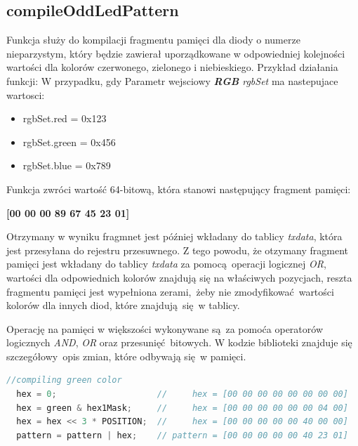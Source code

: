 \documentclass[eng,printmode]{mgr}
\begin{document}
\subsection{compileOddLedPattern} 

Funkcja służy do kompilacji fragmentu pamięci dla diody o numerze nieparzystym, który będzie zawierał uporządkowane w odpowiedniej kolejności wartości dla kolorów czerwonego, zielonego i niebieskiego.
Przykład działania funkcji:
W przypadku, gdy Parametr wejsciowy \emph{\textbf{RGB} rgbSet} ma nastepujace wartosci:

\begin{itemize}
  \item{rgbSet.red   = 0x123}
  \item{rgbSet.green = 0x456}
  \item{rgbSet.blue  = 0x789}
\end{itemize}
             
Funkcja zwróci wartość 64-bitową, która stanowi następujący fragment pamięci:

\vspace{0.3cm}
\hspace{0.3cm} \textbf{[00 00 00 89 67 45 23 01]}
\vspace{0.3cm}

Otrzymany w wyniku fragmnet jest później wkładany do tablicy \emph{txdata}, która jest przesyłana do rejestru przesuwnego. Z tego powodu, że otzymany fragment pamięci jest wkładany do tablicy \emph{txdata} za pomocą operacji logicznej \emph{OR}, wartości dla odpowiednich kolorów znajdują się na właściwych pozycjach, reszta fragmentu pamięci jest wypełniona zerami, żeby nie zmodyfikować wartości kolorów dla innych diod, które znajdują się w tablicy.

Operację na pamięci w większości wykonywane są za pomoća operatorów logicznych \emph{AND}, \emph{OR} oraz przesunięć bitowych. W kodzie biblioteki znajduje się szczegółowy opis zmian, które odbywają się w pamięci.

\vspace{0.3cm}
\begin{lstlisting}[language=c,frame=single,caption={Fragment kodu, w którym przedstawiony jest komentarz ilustrujący efekt wykonywania operacji na pamięci}]
  //compiling green color     
  hex = 0;                    //     hex = [00 00 00 00 00 00 00 00]
  hex = green & hex1Mask;     //     hex = [00 00 00 00 00 00 04 00]
  hex = hex << 3 * POSITION;  //     hex = [00 00 00 00 00 40 00 00]
  pattern = pattern | hex;    // pattern = [00 00 00 00 00 40 23 01]

\end{lstlisting}
\end{document}

